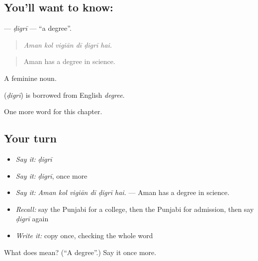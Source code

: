 \subsection*{You'll want to know: }
\textbf{} — \emph{ḍigrī} — \textquotedblleft{}a degree\textquotedblright{}.

\begin{quote}
     
\end{quote}

\begin{quote}
\emph{Aman kol vigiān dī ḍigrī hai.}
\end{quote}

\begin{quote}
Aman has a degree in science.
\end{quote}

A feminine noun.

\begin{cousinweb}
\textbf{} (\emph{ḍigrī}) is borrowed from English \emph{degree}.
\end{cousinweb}

\begin{grammarlens}[title={What you've built}]
One more word for this chapter.
\end{grammarlens}

\subsection*{Your turn}
\begin{itemize}
\raggedright
  \item \emph{Say it:} \emph{ḍigrī}
  \item \emph{Say it:} \emph{ḍigrī}, once more
  \item \emph{Say it:} \emph{Aman kol vigiān dī ḍigrī hai.} — Aman has a degree in science.
  \item \emph{Recall:} say the Punjabi for a college, then the Punjabi for admission, then say \emph{ḍigrī} again
  \item \emph{Write it:} copy \textbf{} once, checking the whole word
\end{itemize}

\begin{tcolorbox}[breakable,colback=teal!4,colframe=teal!35!black,title={Before you move on}]
What does  mean? (\textquotedblleft{}A degree\textquotedblright{}.) Say it once more.
\end{tcolorbox}
